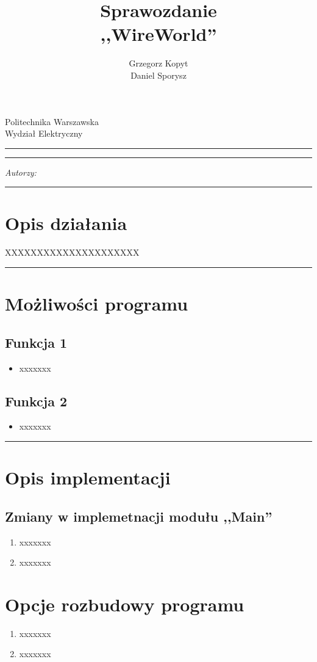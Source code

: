 \documentclass[a4paper,11pt]{article}
\author{Grzegorz Kopyt\\
Daniel Sporysz}
\title{Sprawozdanie\\
,,WireWorld''}
\makeatletter
\newcommand{\linia}{\rule{\linewidth}{0.4mm}}
\renewcommand{\maketitle}{\begin{titlepage}
    \vspace*{2cm}
    \begin{center}\LARGE
    Politechnika Warszawska\\
    Wydział Elektryczny\\
    \end{center}
    \vspace{5cm}
    \noindent\linia
    \begin{center}
      \LARGE \textsc{\@title}
         \end{center}
     \linia
    \vspace{0.5cm}
    \begin{flushright}
    \begin{minipage}{5cm}
    \textit{Autorzy:}\\
    \normalsize \textsc{\@author} \par
    \end{minipage}
    \vspace{5cm}
     \end{flushright}
    \vspace*{\stretch{6}}
    \begin{center}
    \@date
    \end{center}
  \end{titlepage}%
}
\makeatother
\begin{document}
\maketitle


\tableofcontents
\vspace{1cm}
\noindent\linia



\section{Opis działania}
XXXXXXXXXXXXXXXXXXXXX

\noindent\linia
\section{Możliwości programu}

\subsection{Funkcja 1}
\begin{itemize}
\item xxxxxxx
\end{itemize}

\subsection{Funkcja 2}
\begin{itemize}
\item xxxxxxx
\end{itemize}

\noindent\linia
\section{Opis implementacji}

\subsection{Zmiany w implemetnacji modułu ,,Main''}

\begin{enumerate}
\item xxxxxxx

\item xxxxxxx

\end{enumerate}

\section{Opcje rozbudowy programu}
\begin{enumerate}

\item xxxxxxx

\item xxxxxxx

\end{enumerate}
\end{document}
